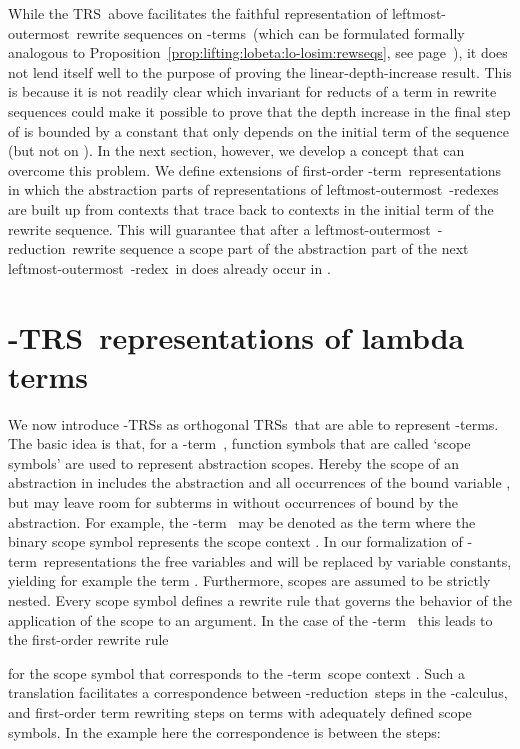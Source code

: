 \documentclass[
submission
]{dmtcs-episciences-tampered}
\newcommand{\nb}{\nobreakdash}
\newcommand{\TRS}{TRS}
\newcommand{\TRSs}{TRSs}
\newcommand{\lambdacalculus}{\nb-cal\-cu\-lus}
\newcommand{\lambdaterm}{\nb-term}
\newcommand{\lambdaterms}{\lambdaterm{s}}
\newcommand{\betareduction}{\nb-re\-duc\-tion}
\newcommand{\betaredex}{\nb-re\-dex}
\newcommand{\lo}{left\-most-outer\-most}
\newcommand{\lTRS}{\hspace*{-0.5pt}\nb-\hspace*{-0.5pt}\TRS}
\theoremstyle{plain}
\theoremstyle{definition}
\begin{document}
While the \TRS\ above facilitates the faithful representation of \lo\ rewrite sequences on \lambdaterms\
(which can be formulated formally analogous to Proposition~\ref{prop:lifting:lobeta:lo-losim:rewseqs}, see page~\pageref{lem:lifting}),
it does not lend itself well to the purpose of proving the linear-depth-increase result.
This is because it is not readily clear which invariant for reducts  of a term  
in rewrite sequences 
could make it possible to prove that the depth increase in the final step of  is bounded by a constant  that only depends on the initial term  of the sequence (but not on ).
In the next section, however, we develop a concept that can overcome this problem.
We define extensions of first-order \lambdaterm\ representations
in which the abstraction parts of representations of \lo\ \betaredex{es} 
are built up from contexts that trace back to contexts in the initial term of the rewrite sequence.
This will guarantee that after a \lo\ \betareduction\ rewrite sequence 
a scope part of the abstraction part  of the next \lo\ \betaredex\  in  
does already occur in . 










\section{\protect\lTRS\ representations of lambda terms}
  \label{sec:lTRSs}


We now introduce \lTRS{s} as orthogonal \TRSs\ that are able to represent \lambdaterms.
The basic idea is that, for a \lambdaterm~, function symbols that are called `scope symbols'
are used to represent abstraction scopes.
Hereby the scope of an abstraction  in  
includes the abstraction  and all occurrences of the bound variable , but may leave room
for subterms in  without occurrences of  bound by the abstraction.
For example, the \lambdaterm~
may be denoted as the term 
where the binary scope symbol  represents the scope context .
In our formalization of \lambdaterm\ representations the free variables  and 
will be replaced by variable constants, yielding for example the term  .
Furthermore, scopes are assumed to be strictly nested.
Every scope symbol defines a rewrite rule that governs the behavior of the application of the scope to an argument.
In the case of the \lambdaterm~
this leads to the first-order rewrite rule 

for the scope symbol  that corresponds to the \lambdaterm\ scope context .
Such a translation facilitates a correspondence between \betareduction\ steps in the \lambdacalculus,
and first-order term rewriting steps on terms with adequately defined scope symbols. In the example here the correspondence is between the steps: 
\end{document}
